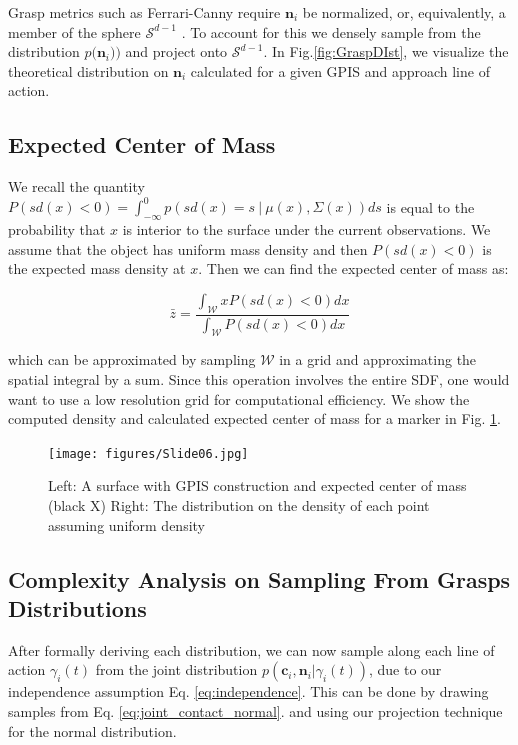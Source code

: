 \documentclass[letterpaper, 10 pt, conference]{ieeeconf}  %
\begin{document}
Grasp metrics such as  Ferrari-Canny require $\textbf{n}_i$ be normalized, or, equivalently, a member of the sphere $\mathcal{S}^{d-1}$ \cite{ferrari1992}. To account for this we densely sample from the  distribution $p \big(\textbf{n}_i ) \big)$  and project onto $\mathcal{S}^{d-1}$.  In Fig.\ref{fig:GraspDIst}, we visualize the theoretical distribution on $\textbf{n}_i$ calculated for a given GPIS and approach line of action.


\subsection{Expected Center of Mass}\label{sec:mass} 

We recall the quantity $P(sd(x) < 0) = \int_{-\infty}^{0} p(sd(x) =  s \ | \ \mu(x),\Sigma(x)) ds$ is equal to the probability that $x$ is interior to the surface under the current observations.
We assume that the object has uniform mass density and then $P(sd(x) < 0)$ is the expected mass density at $x$.
Then we can find the expected center of mass as:

\begin{equation}
  \bar{z} 
  =
  \frac
    {\int_{\mathcal{W}}x P(sd(x)<0) dx}
    {\int_{\mathcal{W}}  P(sd(x)<0) dx}
\end{equation}

which can be approximated by sampling $\mathcal{W}$ in a grid and approximating the spatial integral by a sum. Since this operation involves the entire SDF, one would want to use a low resolution grid for computational efficiency. We show the computed density and calculated expected center of mass for a marker in Fig. \ref{fig:GPIS_MASS}.


\begin{figure}[ht!]
\centering
\texttt{[image: figures/Slide06.jpg]}
\caption{ \footnotesize Left: A surface with GPIS construction and expected center of mass (black X)
Right: The distribution on the density of each point assuming uniform density}
\vspace*{-10pt}
\label{fig:GPIS_MASS}
\end{figure}

\subsection{Complexity Analysis on Sampling From Grasps Distributions}

After formally deriving each distribution,  we can now sample along each line of action $\gamma_i(t)$ from the joint distribution $p(\textbf{c}_i,\textbf{n}_i | \gamma_i(t))$, due to our independence assumption Eq. \ref{eq:independence}. This can be done by drawing samples from Eq. \ref{eq:joint_contact_normal}. and using our projection technique for the normal distribution. 
\end{document}
